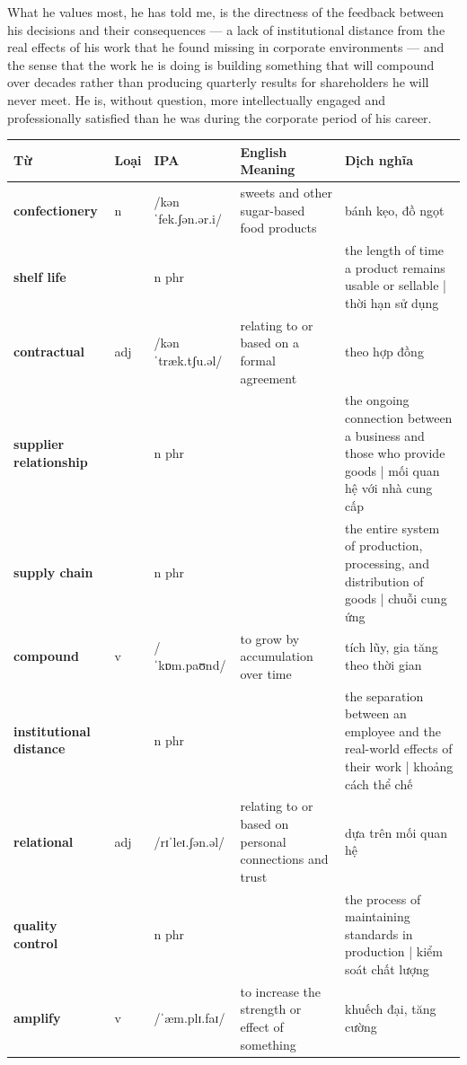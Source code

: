 \begin{ieltsanswer}
What he values most, he has told me, is the directness of the feedback between his decisions and their consequences — a lack of institutional distance from the real effects of his work that he found missing in corporate environments — and the sense that the work he is doing is building something that will compound over decades rather than producing quarterly results for shareholders he will never meet. He is, without question, more intellectually engaged and professionally satisfied than he was during the corporate period of his career.
\end{ieltsanswer}


\vspace{0.8em}
\begin{center}
\renewcommand{\arraystretch}{1.65}
\begin{tabularx}{\textwidth}{|V{0.22\textwidth}|C{0.07\textwidth}|I{0.20\textwidth}|Y|V{0.18\textwidth}|}
\hline
{}
\textbf{Từ} & \textbf{Loại} & \textbf{IPA} & \textbf{English Meaning} & \textbf{Dịch nghĩa} \\
\hline
\textbf{confectionery} & n & /kənˈfek.ʃən.ər.i/ & sweets and other sugar-based food products & bánh kẹo, đồ ngọt \\ \hline
\textbf{shelf life} & & n phr & & the length of time a product remains usable or sellable | thời hạn sử dụng \\ \hline
\textbf{contractual} & adj & /kənˈtræk.tʃu.əl/ & relating to or based on a formal agreement & theo hợp đồng \\ \hline
\textbf{supplier relationship} & & n phr & & the ongoing connection between a business and those who provide goods | mối quan hệ với nhà cung cấp \\ \hline
\textbf{supply chain} & & n phr & & the entire system of production, processing, and distribution of goods | chuỗi cung ứng \\ \hline
\textbf{compound} & v & /ˈkɒm.paʊnd/ & to grow by accumulation over time & tích lũy, gia tăng theo thời gian \\ \hline
\textbf{institutional distance} & & n phr & & the separation between an employee and the real-world effects of their work | khoảng cách thể chế \\ \hline
\textbf{relational} & adj & /rɪˈleɪ.ʃən.əl/ & relating to or based on personal connections and trust & dựa trên mối quan hệ \\ \hline
\textbf{quality control} & & n phr & & the process of maintaining standards in production | kiểm soát chất lượng \\ \hline
\textbf{amplify} & v & /ˈæm.plɪ.faɪ/ & to increase the strength or effect of something & khuếch đại, tăng cường \\ \hline
\end{tabularx}
\end{center}

